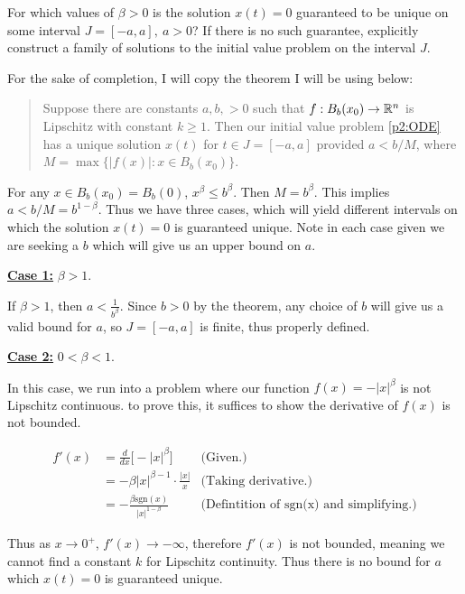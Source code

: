 For which values of $\beta > 0$ is the solution $x(t) = 0$ guaranteed to be unique on some interval $J = [-a, a], \ a > 0$? If there is no such guarantee, explicitly construct a family of solutions to the initial value problem on the interval $J$.   
\partbreak

\begin{solution}

    For the sake of completion, I will copy the theorem I will be using below:

    \alignbreak
    \begin{quote}
            Suppose there are constants $a, b, > 0$ such that $f:B_b(x_0) \rightarrow \mathbb{R}^n$ is Lipschitz with constant $k \geq 1$. Then our initial value problem \ref{p2:ODE} has a unique solution $x(t)$ for $t \in J = [-a, a]$ provided $a < b/M$, where $M = \max \{|f(x)| : x \in B_b(x_0)\}.$
    \end{quote}
    \alignbreak

    For any $x \in B_b(x_0) = B_b(0)$, $x^\beta \leq b^\beta$. Then $M = b^\beta$. This implies $a < b/M = b^{1 - \beta}$. Thus we have three cases, which will yield different intervals on which the solution $x(t) = 0$ is guaranteed unique. Note in each case given we are seeking a $b$ which will give us an upper bound on $a$.

    \jump
    \underline{\textbf{Case 1:}} $\beta > 1$. 
    \jump
    
    If $\beta > 1$, then $a < \frac{1}{b^\beta}$. Since $b > 0$ by the theorem, any choice of $b$ will give us a valid bound for $a$, so $J = [-a, a]$ is finite, thus properly defined. 

    \jump
    \underline{\textbf{Case 2:}} $0 < \beta < 1$.
    \jump

    In this case, we run into a problem where our function $f(x) = -|x|^\beta$ is not Lipschitz continuous. to prove this, it suffices to show the derivative of $f(x)$ is not bounded. 

    \alignbreak
    \begin{align}
        f'(x) &= \frac{d}{dx}\Big[ -|x|^\beta \Big] &\text{(Given.)}\nonumber\\
        &= -\beta|x|^{\beta - 1} \cdot \frac{|x|}{x} &\text{(Taking derivative.)}\nonumber\\
        &= -\frac{\beta\text{sgn}(x)}{|x|^{1 - \beta}} &\text{(Defintition of sgn(x) and simplifying.)}
    \end{align}
    \alignbreak

    Thus as $x \rightarrow 0^+$, $f'(x) \rightarrow -\infty$, therefore $f'(x)$ is not bounded, meaning we cannot find a constant $k$ for Lipschitz continuity. Thus there is no bound for $a$ which $x(t) = 0$ is guaranteed unique.


\end{solution}
